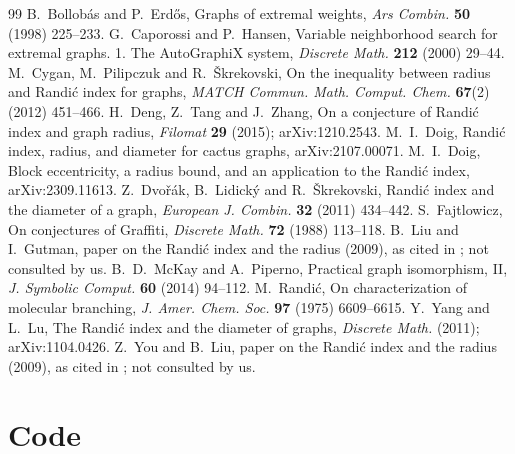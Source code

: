 \documentclass[11pt,a4paper]{article}
\theoremstyle{definition}
\begin{document}
\begin{thebibliography}{99}
 B.~Bollob\'as and P.~Erd\H{o}s, Graphs of extremal weights, \emph{Ars Combin.} \textbf{50} (1998) 225--233.
 G.~Caporossi and P.~Hansen, Variable neighborhood search for extremal graphs. 1. The AutoGraphiX system, \emph{Discrete Math.} \textbf{212} (2000) 29--44.
 M.~Cygan, M.~Pilipczuk and R.~\v{S}krekovski, On the inequality between radius and Randi\'c index for graphs, \emph{MATCH Commun. Math. Comput. Chem.} \textbf{67}(2) (2012) 451--466.
 H.~Deng, Z.~Tang and J.~Zhang, On a conjecture of Randi\'c index and graph radius, \emph{Filomat} \textbf{29} (2015); arXiv:1210.2543.
 M.~I.~Doig, Randi\'c index, radius, and diameter for cactus graphs, arXiv:2107.00071.
 M.~I.~Doig, Block eccentricity, a radius bound, and an application to the Randi\'c index, arXiv:2309.11613.
 Z.~Dvo\v{r}\'ak, B.~Lidick\'y and R.~\v{S}krekovski, Randi\'c index and the diameter of a graph, \emph{European J. Combin.} \textbf{32} (2011) 434--442.
 S.~Fajtlowicz, On conjectures of Graffiti, \emph{Discrete Math.} \textbf{72} (1988) 113--118.
 B.~Liu and I.~Gutman, paper on the Randi\'c index and the radius (2009), as cited in \cite{DLS,DTZ,Doig1}; not consulted by us.
 B.~D.~McKay and A.~Piperno, Practical graph isomorphism, II, \emph{J. Symbolic Comput.} \textbf{60} (2014) 94--112.
 M.~Randi\'c, On characterization of molecular branching, \emph{J. Amer. Chem. Soc.} \textbf{97} (1975) 6609--6615.
 Y.~Yang and L.~Lu, The Randi\'c index and the diameter of graphs, \emph{Discrete Math.} (2011); arXiv:1104.0426.
 Z.~You and B.~Liu, paper on the Randi\'c index and the radius (2009), as cited in \cite{DLS,DTZ,Doig1}; not consulted by us.
\end{thebibliography}

\appendix
\section{Code}\label{app:code}
\end{document}
